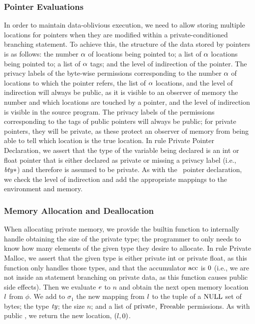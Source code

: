 \subsubsection{Pointer Evaluations} \label{subsec: picco ptr eval}
In order to maintain data-oblivious execution, we need to allow storing multiple locations for pointers when they are modified within a private-conditioned branching statement. To achieve this, 
the structure of the data stored by pointers is as follows: the number $\alpha$ of locations being pointed to; a list of $\alpha$ locations being pointed to; a list of $\alpha$ tags; and the level of indirection of the pointer. 
% 
The privacy labels of the byte-wise permissions corresponding to the number $\alpha$ of locations to which the pointer refers, the list of $\alpha$ locations, and the level of indirection will always be public, as it is visible to an observer of memory the number and which locations are touched by a pointer, and the level of indirection is visible in the source program.
%
The privacy labels of the permissions corresponding to the tags of public pointers will always be public; for private pointers, they will be private, as these protect an observer of memory from being able to tell which location is the true location. 
%
In rule Private Pointer Declaration, we assert that the type of the variable being declared is an int or float pointer that is either declared as private or missing a privacy label (i.e., $\mathit{bty}*$) and therefore is assumed to be private. 
As with the \vanillaC\ pointer declaration, we check the level of indirection and add the appropriate mappings to the environment and memory. 


%
%
\subsubsection{Memory Allocation and Deallocation} \label{subsec: picco mem alloc/dealloc}
When allocating private memory, we provide the  builtin function to internally handle obtaining the size of the private type; the programmer to only needs to know how many elements of the given type they desire to allocate.
In rule Private Malloc, we assert that the given type is either private int or private float, as this function only handles those types, and that the accumulator $\mathrm{acc}$ is $0$ (i.e., we are not inside an  statement branching on private data, as this function causes public side effects). 
Then we evaluate $e$ to $n$ and obtain the next open memory location $l$ from $\phi$. We add to $\sigma{_1}$ the new mapping from $l$ to the tuple of a $\mathrm{NULL}$ set of bytes; the type $\mathit{ty}$; the size $n$; and a list of $\mathrm{private}$, $\mathrm{Freeable}$ permissions. 
As with public , we return the new location, $(l, 0)$. 

